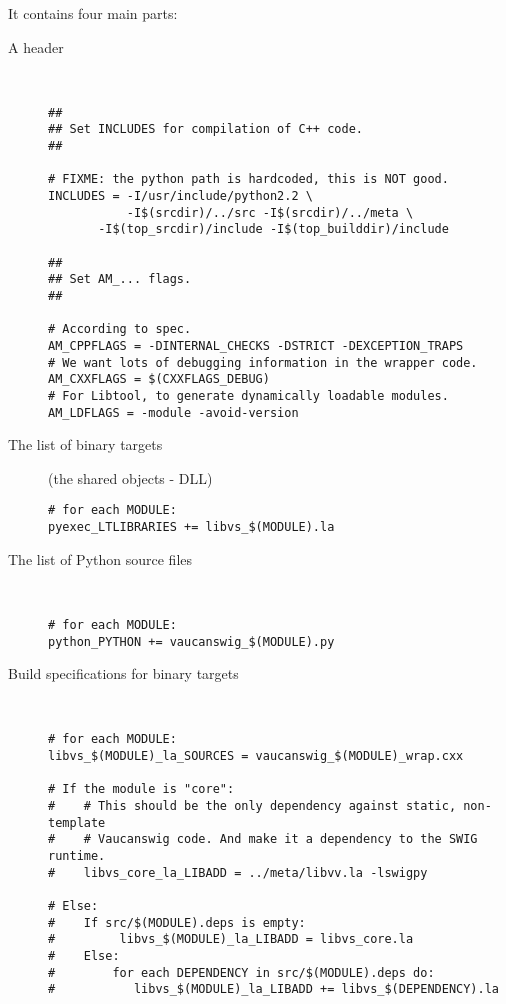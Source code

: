 It contains four main parts:
\begin{description}
\item[A header]~\\
\begin{lstlisting}[language=Make]
##
## Set INCLUDES for compilation of C++ code.
##

# FIXME: the python path is hardcoded, this is NOT good.
INCLUDES = -I/usr/include/python2.2 \
           -I$(srcdir)/../src -I$(srcdir)/../meta \
  	   -I$(top_srcdir)/include -I$(top_builddir)/include

##
## Set AM_... flags.
##

# According to spec.
AM_CPPFLAGS = -DINTERNAL_CHECKS -DSTRICT -DEXCEPTION_TRAPS
# We want lots of debugging information in the wrapper code.
AM_CXXFLAGS = $(CXXFLAGS_DEBUG)
# For Libtool, to generate dynamically loadable modules.
AM_LDFLAGS = -module -avoid-version
\end{lstlisting}%

\item[The list of binary targets]
(the shared objects - DLL)

\begin{lstlisting}[language=Make]
# for each MODULE:
pyexec_LTLIBRARIES += libvs_$(MODULE).la
\end{lstlisting}%

\item[The list of Python source files]~\\

\begin{lstlisting}[language=Make]
# for each MODULE:
python_PYTHON += vaucanswig_$(MODULE).py
\end{lstlisting}%

\item[Build specifications for binary targets]~\\

\begin{lstlisting}[language=Make]
# for each MODULE:
libvs_$(MODULE)_la_SOURCES = vaucanswig_$(MODULE)_wrap.cxx

# If the module is "core":
#    # This should be the only dependency against static, non-template
#    # Vaucanswig code. And make it a dependency to the SWIG runtime.
#    libvs_core_la_LIBADD = ../meta/libvv.la -lswigpy

# Else:
#    If src/$(MODULE).deps is empty:
#	      libvs_$(MODULE)_la_LIBADD = libvs_core.la
#    Else:
#        for each DEPENDENCY in src/$(MODULE).deps do:
#	        libvs_$(MODULE)_la_LIBADD += libvs_$(DEPENDENCY).la
\end{lstlisting}%
\end{description}

